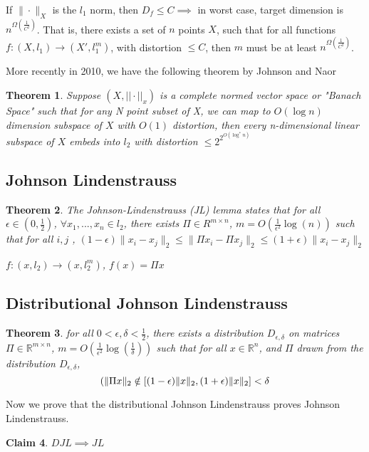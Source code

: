 \documentclass[11pt]{article}
\let\Pr\relax
\DeclareMathOperator*{\Pr}{\mathbb{P}}
\newcommand{\R}{\mathbb{R}}
\newtheorem{theorem}{Theorem}
\newtheorem{claim}[theorem]{Claim}
\begin{document}
If $\|\cdot\|_{X}$ is the $l_{1}$ norm, then $D_{f}\leq C\implies$
in worst case, target dimension is $n^{\Omega(\frac{1}{C^{2}})}$.
That is, there exists a set of $n$ points $X$, such that for all
functions $f:(X,l_{1})\rightarrow(X',l_{1}^{m})$, with distortion
$\leq C$, then $m$ must be at least $n^{\Omega(\frac{1}{C^{2}})}$\cite{BrinkmanC2005}.

More recently in 2010, we have the following theorem by Johnson and Naor \cite{JohnsonN10}
\begin{theorem}
Suppose $(X, ||\cdot||_x)$ is a complete normed vector space or "Banach Space" such that for any N point subset of X, we can map to $O(\log n)$ dimension subspace of $X$ with $O(1)$ distortion, then every n-dimensional linear subspace of $X$ embeds into $l_2$ with distortion $\leq 2^{2^{O(\log^* n)}}$
\end{theorem}

\subsection{Johnson Lindenstrauss}
\begin{theorem}
The Johnson-Lindenstrauss (JL) lemma \cite{JohnsonL84} states that
for all $\epsilon\in(0,\frac{1}{2})$, $\forall x_{1},...,x_{n}\in l_{2}$,
there exists $\Pi\in R^{m\times n}$, $m=O(\frac{1}{\epsilon^{2}}\log(n))$
such that for all $i,j$ , $(1-\epsilon)\|x_{i}-x_{j}\|_{2}\leq\|\Pi x_{i}-\Pi x_{j}\|_{2}\leq(1+\epsilon)\|x_{i}-x_{j}\|_{2}$

$f:(x,l_{2})\rightarrow(x,l_{2}^{m})$, $f(x)=\Pi x$
\end{theorem}

\subsection{Distributional Johnson Lindenstrauss}
\begin{theorem}
for all $0<\epsilon,\delta<\frac{1}{2}$,
there exists a distribution $D_{\epsilon,\delta}$ on matrices $\Pi\in\R^{m\times n}$,
$m=O(\frac{1}{\epsilon^{2}}\log(\frac{1}{\delta}))$ such that
for all $x\in\R^{n}$, and $\Pi$ drawn from the distribution
$D_{\epsilon,\delta}$,
\[
\Pr(\|\Pi x\|_{2}\notin[(1-\epsilon)\|x\|_{2},(1+\epsilon)\|x\|_{2}]<\delta
\]
\end{theorem}
Now we prove that the distributional Johnson Lindenstrauss proves Johnson Lindenstrauss.  

\begin{claim}
$DJL \implies JL$
\end{claim}
\end{document}
